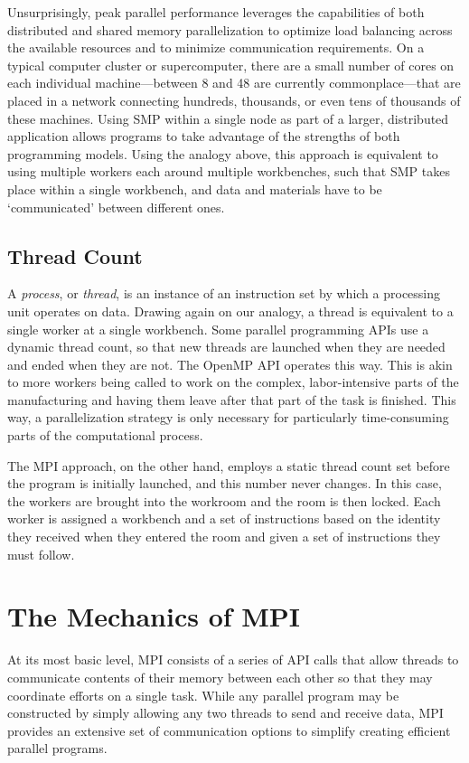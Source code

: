 Unsurprisingly, peak parallel performance leverages the capabilities of both
distributed and shared memory parallelization to optimize load balancing across
the available resources and to minimize communication requirements. On a typical
computer cluster or supercomputer, there are a small number of cores on each
individual machine---between 8 and 48 are currently commonplace---that are
placed in a network connecting hundreds, thousands, or even tens of thousands of
these machines. Using SMP within a single node as part of a larger, distributed
application allows programs to take advantage of the strengths of both
programming models. \cite{Lusk2008} Using the analogy above, this approach is
equivalent to using multiple workers each around multiple workbenches, such that
SMP takes place within a single workbench, and data and materials have to be
`communicated' between different ones.

\subsection{Thread Count}

A \emph{process}, or \emph{thread}, is an instance of an instruction set by
which a processing unit operates on data. Drawing again on our analogy, a thread
is equivalent to a single worker at a single workbench. Some parallel
programming APIs use a dynamic thread count, so that new threads are launched
when they are needed and ended when they are not. The OpenMP API operates this
way. This is akin to more workers being called to work on the complex,
labor-intensive parts of the manufacturing and having them leave after that part
of the task is finished. This way, a parallelization strategy is only necessary
for particularly time-consuming parts of the computational process.

The MPI approach, on the other hand, employs a static thread count set before
the program is initially launched, and this number never changes. In this case,
the workers are brought into the workroom and the room is then locked. Each
worker is assigned a workbench and a set of instructions based on the identity they
received when they entered the room and given a set of instructions they must
follow.

\section{The Mechanics of MPI}

At its most basic level, MPI consists of a series of API calls that allow
threads to communicate contents of their memory between each other so that they
may coordinate efforts on a single task. While any parallel program may be
constructed by simply allowing any two threads to send and receive data, MPI
provides an extensive set of communication options to simplify creating
efficient parallel programs.

